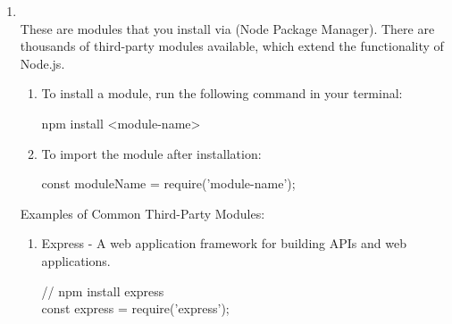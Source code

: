 \documentclass[12pt]{article}
\newenvironment{code}{
  \begin{mdframed}
}{
  \end{mdframed}
}
\begin{document}
\begin{mdframed}
\begin{enumerate}
\begin{enumerate}
  \item \textbf{ (Operating System Module)} - Provides information about the operating
system.
    \begin{code}
    const os = require('os');
    \end{code}

  \item \textbf{ (Event Module)} - Used for handling events and creating event-driven applications.
    \begin{code}
      const EventEmitter = require('events');
    \end{code}

  \item \textbf{ (Utility Module)} - Provides utility functions for handling things like formatting strings, debugging, etc.
    \begin{code}
      const util = require('util');
    \end{code}

  \end{enumerate}

\vspace{0.5cm}
\item \textbf{} \\
  These are modules that you install via  (Node Package Manager). There are thousands of third-party modules available, which extend the functionality of Node.js.

  \begin{enumerate}

  \item To install a module, run the following command in your terminal:
    \begin{code}
      npm install <module-name>
    \end{code}

  \item To import the module after installation:
    \begin{code}
      const moduleName = require('module-name');
    \end{code}

  \end{enumerate}

  Examples of Common Third-Party Modules:

  \begin{enumerate}
  \item Express - A web application framework for building APIs and web applications.
    \begin{code}
      // npm install express \\
      const express = require('express');
    \end{code}


\end{enumerate}
\end{enumerate}
\end{mdframed}
\end{document}
